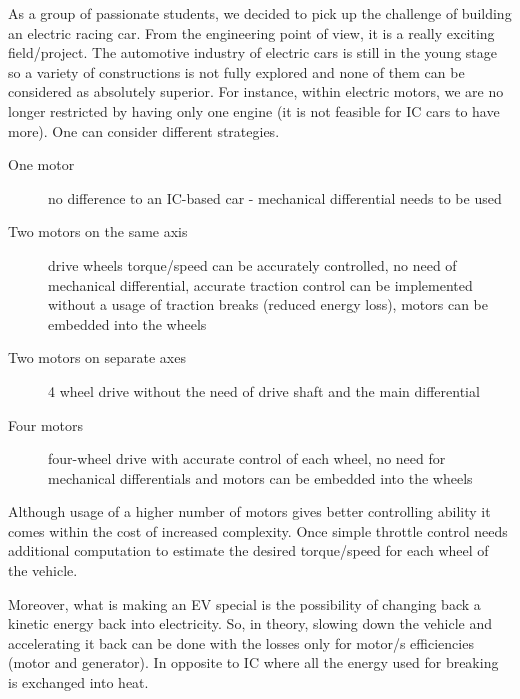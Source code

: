 As a group of passionate students, we decided to pick up the challenge of building an electric racing car. From the engineering point of view, it is a really exciting field/project. The automotive industry of electric cars is still in the young stage so a variety of constructions is not fully explored and none of them can be considered as absolutely superior.
For instance, within electric motors, we are no longer restricted by having only one engine (it is not feasible for IC cars to have more). One can consider different strategies.
\begin{description}
    \item[One motor] no difference to an IC-based car - mechanical differential needs to be used
    \item[Two motors on the same axis] drive wheels torque/speed can be accurately controlled, no need of mechanical differential, accurate traction control can be implemented without a usage of traction breaks (reduced energy loss), motors can be embedded into the wheels
    \item[Two motors on separate axes] 4 wheel drive without the need of drive shaft and the main differential
    \item[Four motors] four-wheel drive with accurate control of each wheel, no need for mechanical differentials and motors can be embedded into the wheels
\end{description}
Although usage of a higher number of motors gives better controlling ability it comes within the cost of increased complexity. Once simple throttle control needs additional computation to estimate the desired torque/speed for each wheel of the vehicle.

Moreover, what is making an EV special is the possibility of changing back a kinetic energy back into electricity. So, in theory, slowing down the vehicle and accelerating it back can be done with the losses only for motor/s efficiencies (motor and generator). In opposite to IC where all the energy used for breaking is exchanged into heat.





